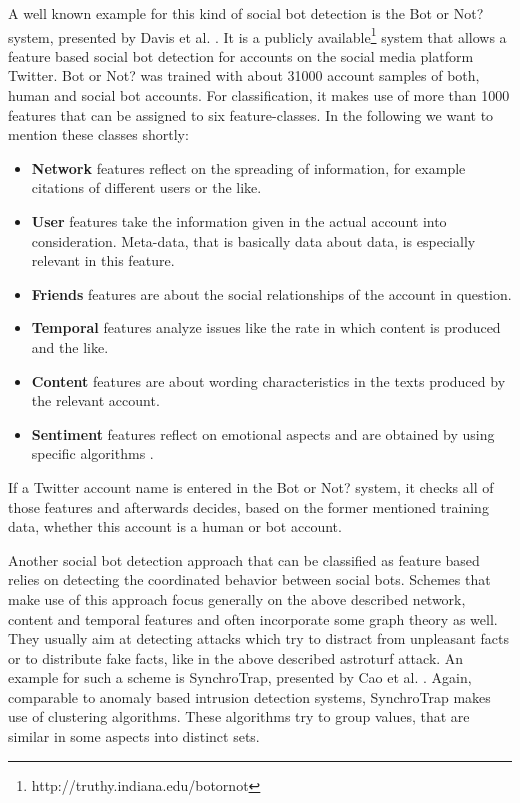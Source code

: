 A well known example for this kind of social bot detection is the Bot or Not? system, presented by Davis et al. \cite{botornot}. It is a publicly available\footnote{http://truthy.indiana.edu/botornot} system that allows a feature based social bot detection for accounts on the social media platform Twitter. Bot or Not? was trained with about 31000 account samples of both, human and social bot accounts. For classification, it makes use of more than 1000 features that can be assigned to six feature-classes. In the following we want to mention these classes shortly:
\begin{itemize}
	\item \textbf{Network} features reflect on the spreading of information, for example citations of different users or the like.
	\item \textbf{User} features take the information given in the actual account into consideration. Meta-data, that is basically data about data, is especially relevant in this feature. 
	\item \textbf{Friends} features are about the social relationships of the account in question.
	\item \textbf{Temporal} features analyze issues like the rate in which content is produced and the like.
	\item \textbf{Content} features are about wording characteristics in the texts produced by the relevant account.
	\item \textbf{Sentiment} features reflect on emotional aspects and are obtained by using specific algorithms \cite{botornot}.
\end{itemize}  
If a Twitter account name is entered in the Bot or Not? system, it checks all of those features and afterwards decides, based on the former mentioned training data, whether this account is a human or bot account.

Another social bot detection approach that can be classified as feature based relies on detecting the coordinated behavior between social bots. Schemes that make use of this approach focus generally on the above described network, content and temporal features and often incorporate some graph theory as well. They usually aim at detecting attacks which try to distract from unpleasant facts or to distribute fake facts, like in the above described astroturf attack.  An example for such a scheme is SynchroTrap, presented by Cao et al.  \cite{synchrotrap}. Again, comparable to anomaly based intrusion detection systems, SynchroTrap makes use of clustering algorithms. These algorithms try to group values, that are similar in some aspects into distinct sets. 

